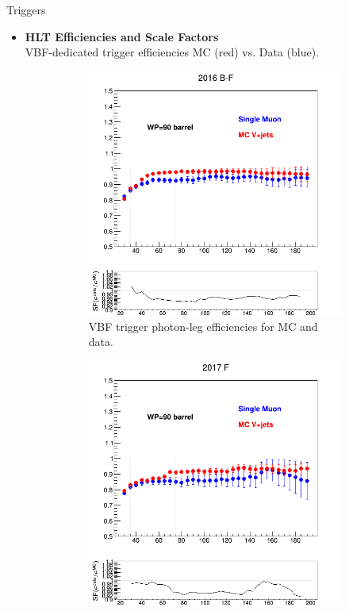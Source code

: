 \documentclass[9pt,aspectratio=1610]{beamer}
\newcommand{\khl}[1]{\textbf{\color{structure}#1}}
\begin{document}
\begin{frame}{Triggers}
	\begin{itemize}
		\item \khl{HLT Efficiencies and Scale Factors}\\
		VBF-dedicated trigger efficiencies MC (red) vs. Data (blue).\\
		\vspace{1em}	
		\begin{figure}
			\centering
			\begin{subfigure}[t]{0.31\linewidth}
				\includegraphics[width=\textwidth]{figures/misc/PhotonFromData_RhoCat12016_WP90_barrel.png}
				\caption{VBF trigger photon-leg efficiencies for MC and data.}
			\end{subfigure}%
			\hfill
			\begin{subfigure}[t]{0.31\linewidth}
				\includegraphics[width=\textwidth]{figures/misc/PhotonFromData_RhoCat2017_WP90_barrel.png}

\end{subfigure}
\end{figure}
\end{itemize}
\end{frame}
\end{document}
